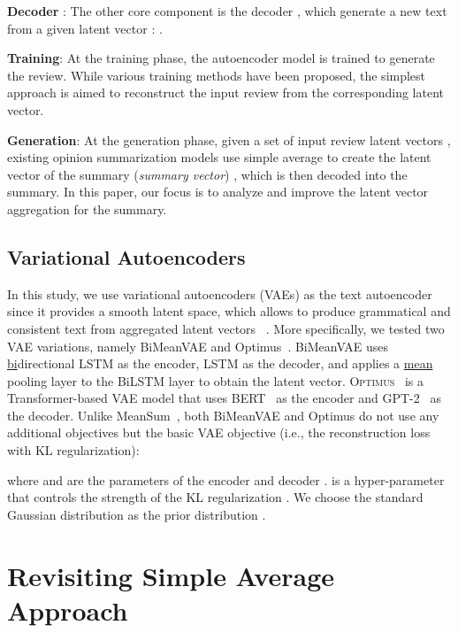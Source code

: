 \documentclass[11pt]{article}
\newcommand{\name}{\mbox{\sc BiMeanVAE}}
\newcommand{\hl}[1]{#1}
\begin{document}
\noindent
{\bf Decoder }: The other core component is the decoder , which generate a new text  from a given latent vector : .

\noindent
{\bf Training}: At the training phase, the autoencoder model is trained to generate the review. While various training methods have been proposed, the simplest approach is aimed to reconstruct the input review from the corresponding latent vector.

\noindent
{\bf Generation}: At the generation phase, given a set of input review latent vectors , existing opinion summarization models use simple average to create the latent vector of the summary ({\em summary vector}) 
, which is then decoded into the summary. In this paper, our focus is to analyze and improve the latent vector aggregation for the summary.

\subsection{Variational Autoencoders}\label{sec:vae}
In this study, we use variational autoencoders (VAEs) as the text autoencoder
since it provides a smooth latent space, which allows to \hl{produce grammatical and consistent text from aggregated latent vectors
~\cite{kingma2014auto,bowman-etal-2016-generating}}. More specifically, we tested two VAE variations, namely \name{} and Optimus~\cite{li-etal-2020-optimus}. \name{} 
uses \underline{bi}directional LSTM as the encoder, LSTM as the decoder, and applies a \underline{mean} pooling layer to the BiLSTM layer to obtain the latent vector. \textsc{Optimus}~\cite{li-etal-2020-optimus} is a Transformer-based VAE model that uses BERT~\cite{devlin-etal-2019-bert} as the encoder and GPT-2~\cite{radford2019language} as the decoder.
Unlike MeanSum~\cite{Chu:2019:MeanSum},
both \name{} and Optimus do not use any additional objectives but the basic VAE objective (i.e., the reconstruction loss with KL regularization):\setlength{\abovedisplayskip}{2mm}
\setlength{\belowdisplayskip}{2mm}

where  and  are the parameters of the encoder  and decoder .
 is a hyper-parameter that controls the strength of the KL regularization .
We choose the standard Gaussian distribution  as the prior distribution .

\section{Revisiting Simple Average Approach}\label{sec:revisiting}
\end{document}
